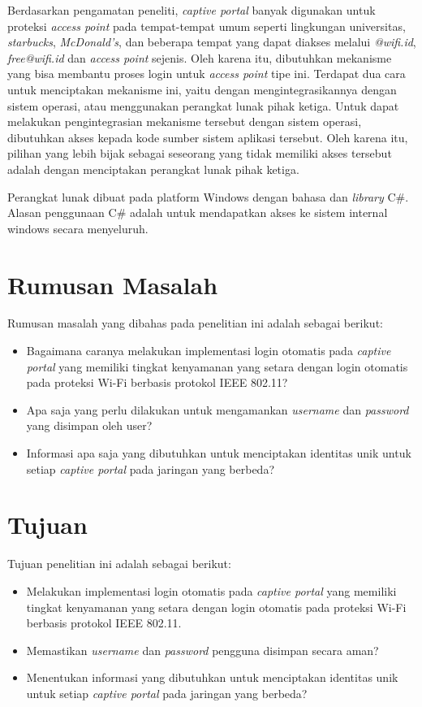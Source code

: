 \documentclass[a4paper,twoside]{article}
\begin{document}
Berdasarkan pengamatan peneliti, \textit{captive portal} banyak digunakan untuk proteksi \textit{access point} pada tempat-tempat umum seperti lingkungan universitas, \textit{starbucks}, \textit{McDonald's}, dan beberapa tempat yang dapat diakses melalui \textit{@wifi.id}, \textit{free@wifi.id} dan \textit{access point} sejenis. Oleh karena itu, dibutuhkan mekanisme yang bisa membantu proses login untuk \textit{access point} tipe ini. Terdapat dua cara untuk menciptakan mekanisme ini, yaitu dengan mengintegrasikannya dengan sistem operasi, atau menggunakan perangkat lunak pihak ketiga. Untuk dapat melakukan pengintegrasian mekanisme tersebut dengan sistem operasi, dibutuhkan akses kepada kode sumber sistem aplikasi tersebut. Oleh karena itu, pilihan yang lebih bijak sebagai seseorang yang tidak memiliki akses tersebut adalah dengan menciptakan perangkat lunak pihak ketiga.

Perangkat lunak dibuat pada platform Windows dengan bahasa dan \textit{library} C\#. Alasan penggunaan C\# adalah untuk mendapatkan akses ke sistem internal windows secara menyeluruh.

\section{Rumusan Masalah}
Rumusan masalah yang dibahas pada penelitian ini adalah sebagai berikut:

\begin{itemize}
	\item{Bagaimana caranya melakukan implementasi login otomatis pada \textit{captive portal} yang memiliki tingkat kenyamanan yang setara dengan login otomatis pada proteksi Wi-Fi berbasis protokol IEEE 802.11?}
	\item{Apa saja yang perlu dilakukan untuk mengamankan \textit{username} dan \textit{password} yang disimpan oleh user?}
	\item{Informasi apa saja yang dibutuhkan untuk menciptakan identitas unik untuk setiap \textit{captive portal} pada jaringan yang berbeda?}
\end{itemize}

\section{Tujuan}
\label{sec:tujuan_penelitian}

Tujuan penelitian ini adalah sebagai berikut:

\begin{itemize}
	\item{Melakukan implementasi login otomatis pada \textit{captive portal} yang memiliki tingkat kenyamanan yang setara dengan login otomatis pada proteksi Wi-Fi berbasis protokol IEEE 802.11.}
	\item{Memastikan \textit{username} dan \textit{password} pengguna disimpan secara aman?}
	\item{Menentukan informasi yang dibutuhkan untuk menciptakan identitas unik untuk setiap \textit{captive portal} pada jaringan yang berbeda?}
\end{itemize}
\end{document}
